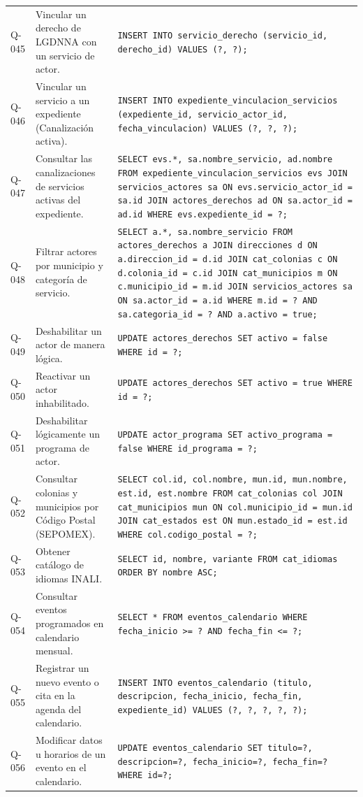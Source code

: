 \begin{table}[H]
\begin{tabular}{l p{4.5cm} p{8.5cm}}
		\addlinespace
		Q-045 & Vincular un derecho de LGDNNA con un servicio de actor. & 
		\texttt{INSERT INTO servicio\_derecho (servicio\_id, derecho\_id) VALUES (?, ?);} \\
		\addlinespace
		Q-046 & Vincular un servicio a un expediente (Canalización activa). & 
		\texttt{INSERT INTO expediente\_vinculacion\_servicios (expediente\_id, servicio\_actor\_id, fecha\_vinculacion) VALUES (?, ?, ?);} \\
		\addlinespace
		Q-047 & Consultar las canalizaciones de servicios activas del expediente. & 
		\texttt{SELECT evs.*, sa.nombre\_servicio, ad.nombre FROM expediente\_vinculacion\_servicios evs JOIN servicios\_actores sa ON evs.servicio\_actor\_id = sa.id JOIN actores\_derechos ad ON sa.actor\_id = ad.id WHERE evs.expediente\_id = ?;} \\
		\addlinespace
		Q-048 & Filtrar actores por municipio y categoría de servicio. & 
		\texttt{SELECT a.*, sa.nombre\_servicio FROM actores\_derechos a JOIN direcciones d ON a.direccion\_id = d.id JOIN cat\_colonias c ON d.colonia\_id = c.id JOIN cat\_municipios m ON c.municipio\_id = m.id JOIN servicios\_actores sa ON sa.actor\_id = a.id WHERE m.id = ? AND sa.categoria\_id = ? AND a.activo = true;} \\
		\addlinespace
		Q-049 & Deshabilitar un actor de manera lógica. & 
		\texttt{UPDATE actores\_derechos SET activo = false WHERE id = ?;} \\
		\addlinespace
		Q-050 & Reactivar un actor inhabilitado. & 
		\texttt{UPDATE actores\_derechos SET activo = true WHERE id = ?;} \\
		\addlinespace
		Q-051 & Deshabilitar lógicamente un programa de actor. & 
		\texttt{UPDATE actor\_programa SET activo\_programa = false WHERE id\_programa = ?;} \\
		\addlinespace
		Q-052 & Consultar colonias y municipios por Código Postal (SEPOMEX). & 
		\texttt{SELECT col.id, col.nombre, mun.id, mun.nombre, est.id, est.nombre FROM cat\_colonias col JOIN cat\_municipios mun ON col.municipio\_id = mun.id JOIN cat\_estados est ON mun.estado\_id = est.id WHERE col.codigo\_postal = ?;} \\
		\addlinespace
		Q-053 & Obtener catálogo de idiomas INALI. & 
		\texttt{SELECT id, nombre, variante FROM cat\_idiomas ORDER BY nombre ASC;} \\
		\addlinespace
		Q-054 & Consultar eventos programados en calendario mensual. & 
		\texttt{SELECT * FROM eventos\_calendario WHERE fecha\_inicio >= ? AND fecha\_fin <= ?;} \\
		\addlinespace
		Q-055 & Registrar un nuevo evento o cita en la agenda del calendario. & 
		\texttt{INSERT INTO eventos\_calendario (titulo, descripcion, fecha\_inicio, fecha\_fin, expediente\_id) VALUES (?, ?, ?, ?, ?);} \\
		\addlinespace
		Q-056 & Modificar datos u horarios de un evento en el calendario. & 
		\texttt{UPDATE eventos\_calendario SET titulo=?, descripcion=?, fecha\_inicio=?, fecha\_fin=? WHERE id=?;} \\
		\bottomrule
	\end{tabular}
\end{table}

